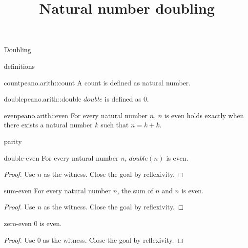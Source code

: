 \begin{lexlean}{Doubling}
\title{Natural number doubling}

\begin{section}{definitions}
  \begin{typedefinition}{count}{peano.arith::count}
  \noaxioms
  A count is defined as natural number.
  \end{typedefinition}

  \begin{termdefinition}{double}{peano.arith::double}
  \noaxioms
  \(double\) is defined as \(0\).
  \end{termdefinition}

  \begin{predicatedefinition}{even}{peano.arith::even}
  \noaxioms
  For every natural number \(n\), \(n\) is even holds exactly when there exists a natural number \(k\) such that \(n = k + k\).
  \end{predicatedefinition}
\end{section}

\begin{section}{parity}
  \begin{theorem}{double-even}
  \noaxioms
  For every natural number \(n\), \(double(n)\) is even.
  \begin{proof}
  Use \(n\) as the witness.
  Close the goal by reflexivity.
  \end{proof}
  \end{theorem}

  \begin{theorem}{sum-even}
  \noaxioms
  For every natural number \(n\), the sum of \(n\) and \(n\) is even.
  \begin{proof}
  Use \(n\) as the witness.
  Close the goal by reflexivity.
  \end{proof}
  \end{theorem}

  \begin{theorem}{zero-even}
  \noaxioms
  \(0\) is even.
  \begin{proof}
  Use \(0\) as the witness.
  Close the goal by reflexivity.
  \end{proof}
  \end{theorem}


\end{section}
\end{lexlean}
